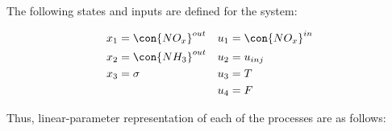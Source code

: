 The following states and inputs are defined for the system:

\begin{align*}
    x_1 &= \con{NO_x}^{out} & u_1 &= \con{NO_x}^{in} \\
    x_2 &= \con{NH_3}^{out} & u_2 &= u_{inj} \\
    x_3 &= \sigma & u_3 &= T\\
        &         & u_4 &= F
\end{align*}

Thus, linear-parameter representation of each of the processes are as follows:















